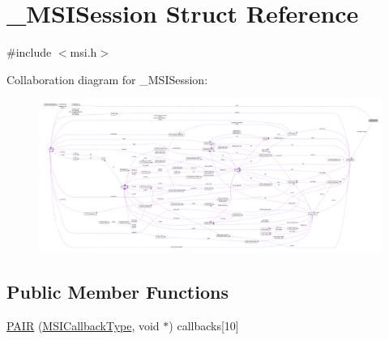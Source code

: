 \hypertarget{struct___m_s_i_session}{\section{\+\_\+\+M\+S\+I\+Session Struct Reference}
\label{struct___m_s_i_session}
}


{\ttfamily \#include $<$msi.\+h$>$}



Collaboration diagram for \+\_\+\+M\+S\+I\+Session\+:
\nopagebreak
\begin{figure}[H]
\begin{center}
\leavevmode
\includegraphics[width=350pt]{df/dd3/struct___m_s_i_session__coll__graph}
\end{center}
\end{figure}
\subsection*{Public Member Functions}
\begin{DoxyCompactItemize}
\item 
\hyperlink{struct___m_s_i_session_ad2cc3cf843c4b08a69f831cdad2eea1a}{P\+A\+I\+R} (\hyperlink{msi_8h_afe514f5cbbbb1153f50ab068d405b864}{M\+S\+I\+Callback\+Type}, void $\ast$) callbacks\mbox{[}10\mbox{]}
\end{DoxyCompactItemize}
